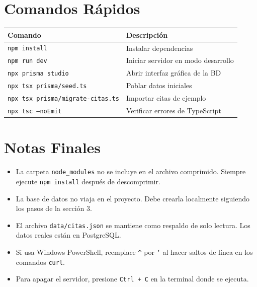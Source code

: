 \documentclass[12pt,a4paper]{article}
\begin{document}
\section{Comandos Rápidos}
\begin{center}
\begin{tabular}{|l|l|}
\hline
\textbf{Comando} & \textbf{Descripción} \\
\hline
\texttt{npm install} & Instalar dependencias \\
\texttt{npm run dev} & Iniciar servidor en modo desarrollo \\
\texttt{npx prisma studio} & Abrir interfaz gráfica de la BD \\
\texttt{npx tsx prisma/seed.ts} & Poblar datos iniciales \\
\texttt{npx tsx prisma/migrate-citas.ts} & Importar citas de ejemplo \\
\texttt{npx tsc --noEmit} & Verificar errores de TypeScript \\
\hline
\end{tabular}
\end{center}

\section{Notas Finales}
\begin{itemize}
    \item La carpeta \texttt{node\_modules} no se incluye en el archivo comprimido. Siempre ejecute \texttt{npm install} después de descomprimir.
    \item La base de datos no viaja en el proyecto. Debe crearla localmente siguiendo los pasos de la sección 3.
    \item El archivo \texttt{data/citas.json} se mantiene como respaldo de solo lectura. Los datos reales están en PostgreSQL.
    \item Si usa Windows PowerShell, reemplace \texttt{\^{}} por \texttt{`} al hacer saltos de línea en los comandos \texttt{curl}.
    \item Para apagar el servidor, presione \texttt{Ctrl + C} en la terminal donde se ejecuta.
\end{itemize}
\end{document}
